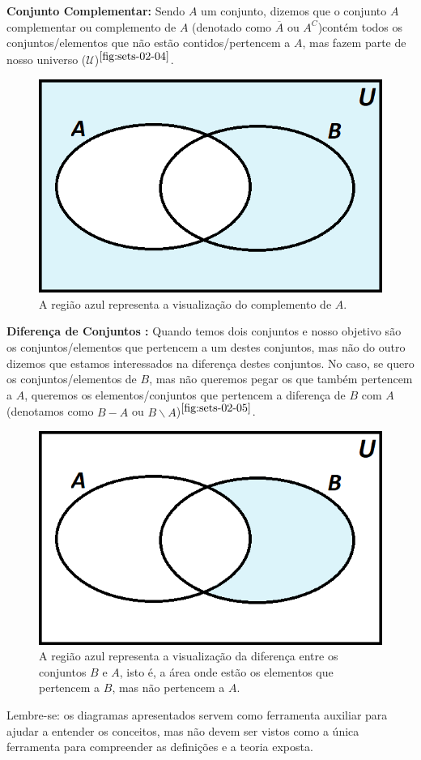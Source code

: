   \textbf{Conjunto Complementar:} Sendo $A$ um conjunto, dizemos que o conjunto $A$ complementar ou complemento de $A$ (denotado como $\overline A$ ou $A^C$)contém todos os conjuntos/elementos que não estão contidos/pertencem a $A$, mas fazem parte de nosso universo ($\mathcal U$)$^{\ref{fig:sets-02-04}}$.
  
  \begin{figure}[hbt!]
      \centering      
      \includegraphics[width = 7 cm]{figures/sets/fig-sets-02-04.png}
      \caption{A região azul representa a visualização do complemento de $A$.}
      \label{fig:sets-02-04}
  \end{figure}
  
  \textbf{Diferença de Conjuntos :} Quando temos dois conjuntos e nosso objetivo são os conjuntos/elementos que pertencem a um destes conjuntos, mas não do outro dizemos que estamos interessados na diferença destes conjuntos. No caso, se quero os conjuntos/elementos de $B$, mas não queremos pegar os que também pertencem a $A$, queremos os elementos/conjuntos que pertencem a diferença de $B$ com $A$ (denotamos como $B-A$ ou $B \backslash A$)$^{\ref{fig:sets-02-05}}$.
  
  \begin{figure}[hbt!]
      \centering      
      \includegraphics[width = 7 cm]{figures/sets/fig-sets-02-05.png}
      \caption{A região azul representa a visualização da diferença entre os conjuntos $B$ e $A$, isto é, a área onde estão os elementos que pertencem a $B$, mas não pertencem a $A$.}
      \label{fig:sets-02-05}
  \end{figure}
  
  Lembre-se: os diagramas apresentados servem como ferramenta auxiliar para ajudar a entender os conceitos, mas não devem ser vistos como a única ferramenta para compreender as definições e  a teoria exposta.
    
